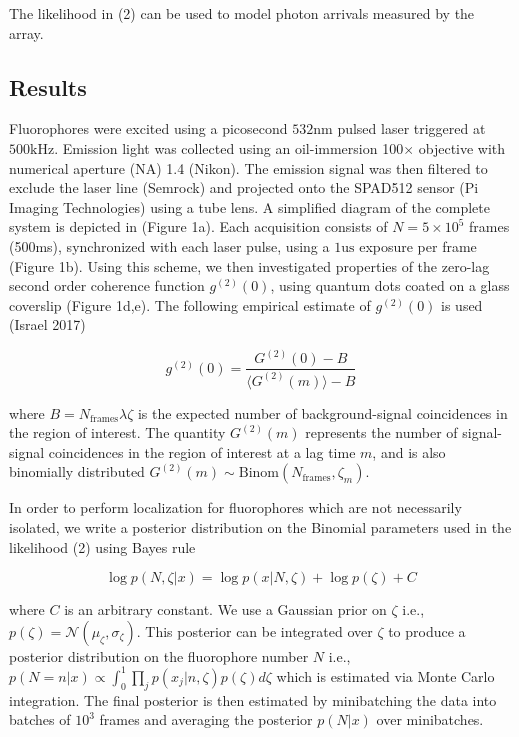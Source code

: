 \documentclass[a4paper, twocolumn, superscriptaddress,prl]{revtex4}  %
\begin{document}
The likelihood in (2) can be used to model photon arrivals measured by the array.


\subsection{Results}

 
Fluorophores were excited using a picosecond $532\mathrm{nm}$ pulsed laser triggered at $500\mathrm{kHz}$. Emission light was collected using an oil-immersion 100$\times$ objective with numerical aperture (NA) 1.4 (Nikon). The emission signal was then filtered to exclude the laser line (Semrock) and projected onto the SPAD512 sensor (Pi Imaging Technologies) using a tube lens. A simplified diagram of the complete system is depicted in (Figure 1a). Each acquisition consists of $N=5\times 10^{5}$ frames (500ms), synchronized with each laser pulse, using a $1\mathrm{us}$ exposure per frame (Figure 1b). Using this scheme, we then investigated properties of the zero-lag second order coherence function $g^{(2)}(0)$, using quantum dots coated on a glass coverslip (Figure 1d,e). The following empirical estimate of $g^{(2)}(0)$ is used (Israel 2017)

\begin{equation}
g^{(2)}(0) = \frac{G^{(2)}(0)-B}{\langle G^{(2)}(m)\rangle -B}
\end{equation}

where $B = N_{\mathrm{frames}}\lambda\zeta$ is the expected number of background-signal coincidences in the region of interest. The quantity $G^{(2)}(m)$ represents the number of signal-signal coincidences in the region of interest at a lag time $m$, and is also binomially distributed $G^{(2)}(m)\sim \mathrm{Binom}(N_{\mathrm{frames}},\zeta_{m})$.

In order to perform localization for fluorophores which are not necessarily isolated, we write a posterior distribution on the Binomial parameters used in the likelihood (2) using Bayes rule

\begin{equation*}
\log p(N,\zeta|x) = \log p(x|N,\zeta) + \log p(\zeta) + C
\end{equation*}

where $C$ is an arbitrary constant. We use a Gaussian prior on $\zeta$ i.e., $p(\zeta) = \mathcal{N}(\mu_{\zeta},\sigma_{\zeta})$. This posterior can be integrated over $\zeta$ to produce a posterior distribution on the fluorophore number $N$ i.e., $p(N=n|x) \propto \int_{0}^{1} \prod_{j} p(x_{j}|n,\zeta)p(\zeta) d\zeta$ which is estimated via Monte Carlo integration. The final posterior is then estimated by minibatching the data into batches of $10^3$ frames and averaging the posterior $p(N|x)$ over minibatches.
\end{document}
